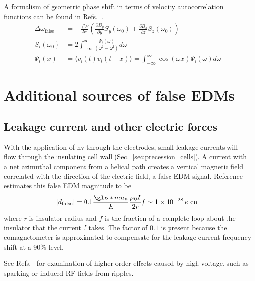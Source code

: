 A formalism of geometric phase shift in terms of velocity autocorrelation functions can be found in Refs.~\cite{lamoreaux_geometric_phase_2005, barabanov_geometric_phase_2006, swank_geometric_phase_2009}.
%
\begin{align}
    \Delta\omega_\text{false} &= -\frac{\gamma^2 E}{2c^2}\left( \frac{\partial B_y}{\partial y} S_y(\omega_0) + \frac{\partial B_z}{\partial z} S_z(\omega_0) \right) \\
    S_i(\omega_0) &= 2\int_{-\infty}^{\infty} \frac{\Psi_i(\omega)}{(\omega_0^2 - \omega^2)}d\omega \\
    \Psi_i(x) &= \langle v_i(t)v_i(t-x) \rangle = \int_{-\infty}^{\infty}\cos (\omega x) \Psi_i (\omega) d\omega
\end{align}



\section{Additional sources of false EDMs}


\subsection*{Leakage current and other electric forces}

With the application of \acrshort{hv} through the electrodes, small leakage currents will flow through the insulating cell wall (Sec.~\ref{sec:precession_cells}). A current with a net azimuthal component from a helical path creates a vertical magnetic field correlated with the direction of the electric field, a false EDM signal. Reference~\cite{baker_apparatus_2014} estimates this false EDM magnitude to be
%
\begin{gather}
    | d_\text{false} | = 0.1\frac{\gls*{mu_n}}{E}\frac{\mu_0 I}{2r}f \sim \num{1e-28}\,e\text{ cm}
\end{gather}
%
where $r$ is insulator radius and $f$ is the fraction of a complete loop about the insulator that the current $I$ takes. The factor of $0.1$ is present because the \hg comagnetometer is approximated to compensate for the leakage current frequency shift at a 90\% level.

See Refs.~\cite{baker_apparatus_2014, pendlebury_revised_2015} for examination of higher order effects caused by high voltage, such as sparking or induced RF fields from ripples.

